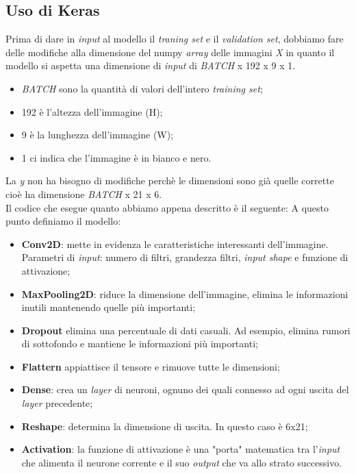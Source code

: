 \subsection{Uso di Keras}
Prima di dare in \textit{input} al modello il \textit{traning set} e il \textit{validation set}, dobbiamo fare delle modifiche alla dimensione del numpy \textit{array} delle immagini \textit{X} in quanto il modello si aspetta una dimensione di \textit{input} di \textit{BATCH} x 192 x 9 x 1.
\begin{itemize}
	\item \textit{BATCH} sono la quantità di valori dell'intero \textit{training set};
	\item 192 è l'altezza dell'immagine (H);
	\item 9 è la lunghezza dell'immagine (W);
	\item 1 ci indica che l'immagine è in bianco e nero.
\end{itemize}
La \textit{y} non ha bisogno di modifiche perchè le dimensioni sono già quelle corrette cioè ha dimensione \textit{BATCH} x 21 x 6.\\
\newline
Il codice che esegue quanto abbiamo appena descritto è il seguente:
\vspace*{2ex}
\vspace*{2ex}
A questo punto definiamo il modello:
\begin{itemize}
	\item \textbf{Conv2D}: mette in evidenza le caratteristiche interessanti dell'immagine. Parametri di \textit{input}: numero di filtri, grandezza filtri, \textit{input shape} e funzione di attivazione;
	\item \textbf{MaxPooling2D}: riduce la dimensione dell'immagine, elimina le informazioni inutili mantenendo quelle più importanti;
	\item \textbf{Dropout} elimina una percentuale di dati casuali. Ad esempio, elimina rumori di sottofondo e mantiene le informazioni più importanti;
	\item \textbf{Flattern} appiattisce il tensore e rimuove tutte le dimensioni;
	\item \textbf{Dense}: crea un \textit{layer} di neuroni, ognuno dei quali connesso ad ogni uscita del \textit{layer} precedente;
	\item \textbf{Reshape}: determina la dimensione di uscita. In questo caso è 6x21;
	\item \textbf{Activation}: la funzione di attivazione è una "porta" matematica tra l'\textit{input} che alimenta il neurone corrente e il suo \textit{output} che va allo strato successivo.
\end{itemize}
